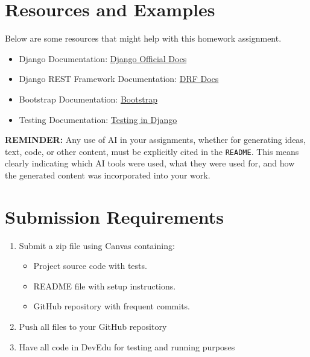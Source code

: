 \documentclass{article}
\begin{document}
\section{Resources and Examples}
Below are some resources that might help with this homework assignment. 

\begin{itemize}
    \item Django Documentation: \href{https://docs.djangoproject.com/en/stable/}{Django Official Docs}
    \item Django REST Framework Documentation: \href{https://www.django-rest-framework.org/}{DRF Docs}
    \item Bootstrap Documentation: \href{https://getbootstrap.com/docs/5.3/getting-started/introduction/}{Bootstrap}
    \item Testing Documentation: \href{https://docs.djangoproject.com/en/stable/topics/testing/}{Testing in Django}
\end{itemize}

\textbf{REMINDER:} Any use of AI in your assignments, whether for generating ideas, text, code, or other content, must be explicitly cited in the \texttt{README}.  This means clearly indicating which AI tools were used, what they were used for, and how the generated content was incorporated into your work.

\section{Submission Requirements}
\begin{enumerate}
    \item Submit a zip file using Canvas containing: \begin{itemize}
        \item Project source code with tests.
        \item README file with setup instructions.
        \item GitHub repository with frequent commits.
\end{itemize}
    \item Push all files to your GitHub repository
    \item Have all code in DevEdu for testing and running purposes
\end{enumerate}
\end{document}
